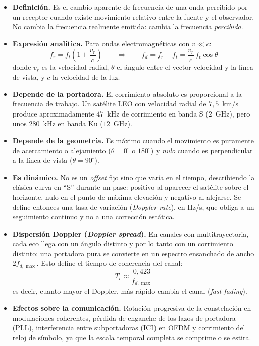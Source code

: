\documentclass[12pt,a4paper]{article}
\begin{document}
\begin{itemize}
  \item \textbf{Definición.} Es el cambio aparente de frecuencia de una onda percibido
        por un receptor cuando existe movimiento relativo entre la fuente y el
        observador. No cambia la frecuencia realmente emitida: cambia la frecuencia
        \emph{percibida}.

  \item \textbf{Expresión analítica.} Para ondas electromagnéticas con $v \ll c$:
        \begin{equation}
          f_r = f_t\left(1 + \frac{v_r}{c}\right)
          \qquad \Longrightarrow \qquad
          f_d = f_r - f_t = \frac{v_r}{c}\, f_t \cos\theta
        \end{equation}
        donde $v_r$ es la velocidad radial, $\theta$ el ángulo entre el vector velocidad
        y la línea de vista, y $c$ la velocidad de la luz.

  \item \textbf{Depende de la portadora.} El corrimiento absoluto es proporcional a la
        frecuencia de trabajo. Un satélite LEO con velocidad radial de $7{,}5$~km/s
        produce aproximadamente $47$~kHz de corrimiento en banda S ($2$~GHz), pero unos
        $280$~kHz en banda Ku ($12$~GHz).

  \item \textbf{Depende de la geometría.} Es máximo cuando el movimiento es puramente de
        acercamiento o alejamiento ($\theta = 0^\circ$ o $180^\circ$) y \emph{nulo}
        cuando es perpendicular a la línea de vista ($\theta = 90^\circ$).

  \item \textbf{Es dinámico.} No es un \emph{offset} fijo sino que varía en el tiempo,
        describiendo la clásica curva en ``S'' durante un pase: positivo al aparecer el
        satélite sobre el horizonte, nulo en el punto de máxima elevación y negativo al
        alejarse. Se define entonces una tasa de variación (\emph{Doppler rate}), en
        Hz/s, que obliga a un seguimiento continuo y no a una corrección estática.

  \item \textbf{Dispersión Doppler (\emph{Doppler spread}).} En canales con
        multitrayectoria, cada eco llega con un ángulo distinto y por lo tanto con un
        corrimiento distinto: una portadora pura se convierte en un espectro ensanchado
        de ancho $2 f_{d,\max}$. Esto define el tiempo de coherencia del canal:
        \begin{equation}
          T_c \approx \frac{0{,}423}{f_{d,\max}}
        \end{equation}
        es decir, cuanto mayor el Doppler, más rápido cambia el canal
        (\emph{fast fading}).

  \item \textbf{Efectos sobre la comunicación.} Rotación progresiva de la constelación en
        modulaciones coherentes, pérdida de enganche de los lazos de portadora (PLL),
        interferencia entre subportadoras (ICI) en OFDM y corrimiento del reloj de
        símbolo, ya que la escala temporal completa se comprime o se estira.
\end{itemize}
\end{document}
